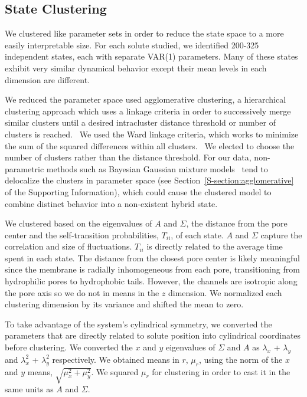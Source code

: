 \documentclass[journal=jpcbfk,manuscript=article]{achemso}
\begin{document}
  \subsection{State Clustering}\label{method:clustering}  

  We clustered like parameter sets in order to reduce the state space to
  a more easily interpretable size. For each solute studied, we identified 200-325
  independent states, each with separate VAR(1) parameters. Many of these states
  exhibit very similar dynamical behavior except their mean levels in each dimension
  are different.
  
  We reduced the parameter space used agglomerative clustering, a hierarchical
  clustering approach which uses a linkage criteria in order to successively merge
  similar clusters until a desired intracluster distance threshold or number of
  clusters is reached.~\cite{pedregosa_scikit-learn_2011} We used the Ward linkage 
  criteria, which works to minimize the sum of the squared differences within all
  clusters.~\cite{ward_hierarchical_1963} We elected to choose the number of clusters
  rather than the distance threshold. For our data, non-parametric methods such as 
  Bayesian Gaussian mixture models~\cite{pedregosa_scikit-learn_2011,gelman_bayesian_2013}
  tend to delocalize the clusters in parameter space (see Section~\ref{S-section:agglomerative}
  of the Supporting Information), which could cause the clustered model to combine 
  distinct behavior into a non-existent hybrid state.

  We clustered based on the eigenvalues of $A$ and $\Sigma$, the distance from the 
  pore center and the self-transition probabilities, $T_{ii}$, of each state. $A$ 
  and $\Sigma$ capture the correlation and size of fluctuations. $T_{ii}$ is directly
  related to the average time spent in each state. The distance from the closest pore 
  center is likely meaningful since the membrane is radially inhomogeneous from each 
  pore, transitioning from hydrophilic pores to hydrophobic tails. However, the 
  channels are isotropic along the pore axis so we do not in means in the $z$ dimension.
  We normalized each clustering dimension by its variance and shifted the mean to zero.
  
  To take advantage of the system's cylindrical symmetry, we converted the parameters that
  are directly related to solute position into cylindrical coordinates before clustering. We 
  converted the $x$ and $y$ eigenvalues of $\Sigma$ and $A$ as $\lambda_x$ + $\lambda_y$
  and $\lambda_x^2$ + $\lambda_y^2$ respectively. %
  We obtained means in $r$, $\mu_r$, using the norm of the $x$ and $y$ means, 
  $\sqrt{\mu_x^2 + \mu_y^2}$. We squared $\mu_r$ for clustering in order to cast it in the
  same units as $A$ and $\Sigma$.
\end{document}
